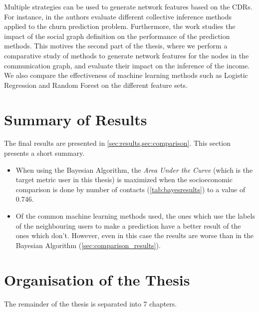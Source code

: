 Multiple strategies can be used to generate network features based on the CDRs. For instance, in \cite{oskarsdottir2016} the authors evaluate different collective inference methods applied to the churn prediction problem. Furthermore, the work \cite{oskarsdottir2017social} studies the impact of the social graph definition on the performance of the prediction methods. This motives the second part of the thesis, where we perform a comparative study of methods to generate network features for the nodes in the communication graph, and evaluate their impact on the inference of the income. We also compare the effectiveness of machine learning methods such as Logistic Regression and Random Forest on the different feature sets.

\section{Summary of Results}

The final results are presented in \cref{sec:results,sec:comparison}. This section presents a short summary.
\begin{itemize}
	\item When using the Bayesian Algorithm, the \emph{Area Under the Curve} (which is the target metric user in this thesis) is maximized when the socioeconomic comparison is done by number of contacts (\cref{tab:bayesresults}) to a value of \num{0.746}.
	\item Of the common machine learning methods used, the ones which use the labels of the neighbouring users to make a prediction have a better result of the ones which don't. However, even in this case the results are worse than in the Bayesian Algorithm (\cref{sec:comparison_results}).
\end{itemize}

\section{Organisation of the Thesis}

The remainder of the thesis is separated into 7 chapters.


